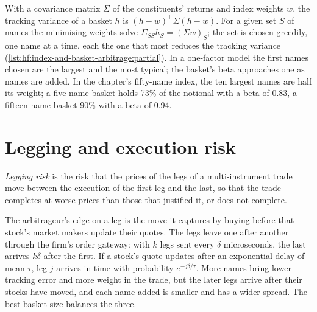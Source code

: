 With a covariance matrix $\Sigma$ of the constituents' returns and index weights $w$, the tracking variance of a basket $h$ is
$(h-w)^\top\Sigma(h-w)$. For a given set $S$ of names the minimising weights solve $\Sigma_{SS}h_S=(\Sigma w)_S$; the set is chosen greedily, one
name at a time, each the one that most reduces the tracking variance
(\cref{lst:hf:index-and-basket-arbitrage:partial}). In a one-factor model the first names chosen are the largest and the most typical; the basket's
beta approaches one as names are added. In the chapter's fifty-name index, the ten largest names are half its weight; a five-name basket holds
73\% of the notional with a beta of 0.83, a fifteen-name basket 90\% with a beta of 0.94.

\section{Legging and execution risk}

\begin{definition}\label{def:hf:index-and-basket-arbitrage:legging}
\emph{Legging risk} is the risk that the prices of the legs of a multi-instrument trade move between the execution of the
first leg and the last, so that the trade completes at worse prices than those that justified it, or does not complete.
\end{definition}

The arbitrageur's edge on a leg is the move it captures by buying before that stock's market makers update their quotes. The legs leave one after
another through the firm's order gateway: with $k$ legs sent every $\delta$ microseconds, the last arrives $k\delta$ after the first. If a stock's
quote updates after an exponential delay of mean $\tau$, leg $j$ arrives in time with probability $e^{-j\delta/\tau}$. More names bring lower
tracking error and more weight in the trade, but the later legs arrive after their stocks have moved, and each name added is smaller and has a wider
spread. The best basket size balances the three.

